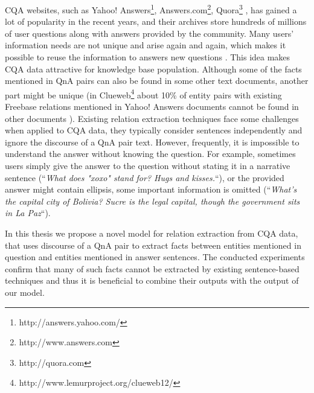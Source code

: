 CQA websites, such as Yahoo! Answers\footnote{http://answers.yahoo.com/}, Answers.com\footnote{http://www.answers.com}, Quora\footnote{http://quora.com} \etc, has gained a lot of popularity in the recent years, and their archives store hundreds of millions of user questions along with answers provided by the community.
Many users' information needs are not unique and arise again and again, which makes it possible to reuse the information to answers new questions \cite{Shtok:2012:LPA:2187836.2187939}.
This idea makes CQA data attractive for knowledge base population.
Although some of the facts mentioned in QnA pairs can also be found in some other text documents, another part might be unique (\eg in Clueweb\footnote{http://www.lemurproject.org/clueweb12/} about 10\% of entity pairs with existing Freebase relations mentioned in Yahoo! Answers documents cannot be found in other documents \cite{savenkov2015relation}).
Existing relation extraction techniques face some challenges when applied to CQA data, \ie they typically consider sentences independently and ignore the discourse of a QnA pair text.
However, frequently, it is impossible to understand the answer without knowing the question.
For example, sometimes users simply give the answer to the question without stating it in a narrative sentence (\eg ``\emph{What does "xoxo" stand for? Hugs and kisses.}``), or the provided answer might contain ellipsis, \ie some important information is omitted (\eg ``\emph{What's the capital city of Bolivia? Sucre is the legal capital, though the government sits in La Paz}``).

In this thesis we propose a novel model for relation extraction from CQA data, that uses discourse of a QnA pair to extract facts between entities mentioned in question and entities mentioned in answer sentences.
The conducted experiments confirm that many of such facts cannot be extracted by existing sentence-based techniques and thus it is beneficial to combine their outputs with the output of our model. 

